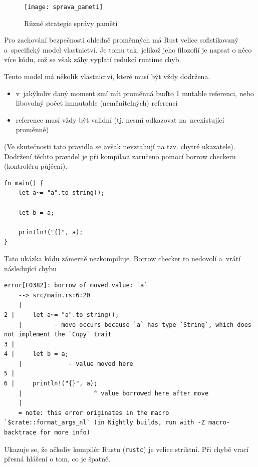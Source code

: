 \documentclass[a4paper, 12pt, twoside]{article} %
\begin{document}
			\begin{center}
				\begin{figure}[H]
					\centering
					\texttt{[image: sprava\_pameti]}
					\caption{Různé strategie správy paměti \cite{sprava_pameti}}
					\label{fig:ret_mod}
				\end{figure}
			\end{center}
		
			Pro zachování bezpečnosti ohledně proměnných má Rust velice sofistikovaný a~specifický model vlastnictví. Je tomu tak, jelikož jeho filozofií je napsat o něco více kódu, což se však záhy vyplatí redukcí runtime chyb.
	
			Tento model má několik vlastnictví, které musí být vždy dodržena.
			\begin{itemize}
				\item v~jakýkoliv daný moment smí mít proměnná buďto 1 mutable referenci, nebo libovolný počet immutable (neměnitelných) referencí
				\item reference musí vždy být validní (tj. nesmí odkazovat na~neexistující proměnné)
			\end{itemize}
			
			(Ve skutečnosti tato pravidla se avšak nevztahují na tzv. chytré ukazatele). Dodržení těchto pravidel je při kompilaci zaručeno pomocí borrow checkeru (kontroléru půjčení).
			\begin{verbatim}
fn main() {
	let a~= "a".to_string();
	
	let b = a;
	
	println!("{}", a);
}
			\end{verbatim}
	
			Tato ukázka kódu zámerně nezkompiluje. Borrow checker to nedovolí a~vrátí následující chybu
			\begin{verbatim}
error[E0382]: borrow of moved value: `a`
	--> src/main.rs:6:20
	|
2 |     let a~= "a".to_string();
	|         - move occurs because `a` has type `String`, which does not implement the `Copy` trait
3 |     
4 |     let b = a;
	|             - value moved here
5 |     
6 |     println!("{}", a);
	|                    ^ value borrowed here after move
	|
	= note: this error originates in the macro `$crate::format_args_nl` (in Nightly builds, run with -Z macro-backtrace for more info)

				\end{verbatim}
					
				Ukazuje se, že ačkoliv kompilér Rustu (\texttt{rustc}) je velice striktní. Při chybě vrací přesná hlášení o tom, co je špatně.
				
\end{document}

